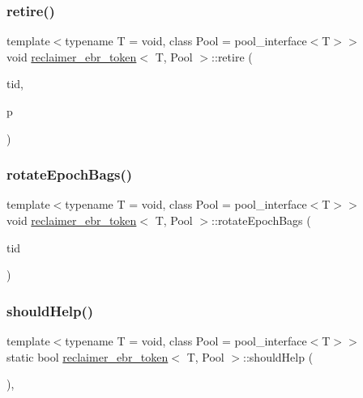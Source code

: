 \subsubsection{\texorpdfstring{retire()}{retire()}}
{\footnotesize\ttfamily template$<$typename T  = void, class Pool  = pool\+\_\+interface$<$\+T$>$$>$ \\
void \hyperlink{classreclaimer__ebr__token}{reclaimer\+\_\+ebr\+\_\+token}$<$ T, Pool $>$\+::retire (\begin{DoxyParamCaption}\item[{const int}]{tid,  }\item[{T $\ast$}]{p }\end{DoxyParamCaption})\hspace{0.3cm}{\ttfamily [inline]}}

\mbox{\label{classreclaimer__ebr__token_a36bc96f3000460deab02e93a24e137fa}} 
\subsubsection{\texorpdfstring{rotate\+Epoch\+Bags()}{rotateEpochBags()}}
{\footnotesize\ttfamily template$<$typename T  = void, class Pool  = pool\+\_\+interface$<$\+T$>$$>$ \\
void \hyperlink{classreclaimer__ebr__token}{reclaimer\+\_\+ebr\+\_\+token}$<$ T, Pool $>$\+::rotate\+Epoch\+Bags (\begin{DoxyParamCaption}\item[{const int}]{tid }\end{DoxyParamCaption})\hspace{0.3cm}{\ttfamily [inline]}}

\mbox{\label{classreclaimer__ebr__token_ae3f31ec8fd28eeaaa86ca58fcfe9ca64}} 
\subsubsection{\texorpdfstring{should\+Help()}{shouldHelp()}}
{\footnotesize\ttfamily template$<$typename T  = void, class Pool  = pool\+\_\+interface$<$\+T$>$$>$ \\
static bool \hyperlink{classreclaimer__ebr__token}{reclaimer\+\_\+ebr\+\_\+token}$<$ T, Pool $>$\+::should\+Help (\begin{DoxyParamCaption}{ }\end{DoxyParamCaption})\hspace{0.3cm}{\ttfamily [inline]}, {\ttfamily [static]}}

